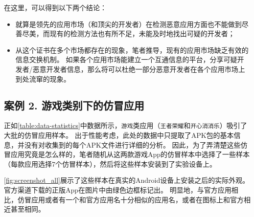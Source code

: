 在这里，可以得到以下两个结论：
\begin{itemize}
    \item 就算是领先的应用市场（和顶尖的开发者）在检测恶意应用方面也不能做到尽善尽美，而现有的检测方法也有所不足，未能及时地找出可疑的开发者；
    \item 从这个证书在多个市场都存在的现象，笔者推导，现有的应用市场缺乏有效的信息交换机制。
    如果各个应用市场能建立一个互通信息的平台，分享可疑开发者/恶意开发者信息，那么将可以杜绝一部分恶意开发者在各个应用市场上到处流窜的现象。
\end{itemize}

\subsection{案例 2. 游戏类别下的仿冒应用}

正如\autoref{table:data-statistics}中数据所示，\texttt{游戏}类应用（\texttt{王者荣耀}和\texttt{开心消消乐}）吸引了大批的仿冒应用样本。
出于性能考虑，此处的数据中只提取了APK包的基本信息，并没有对收集到的每个APK文件进行详细的分析。
因此，为了弄清楚这些仿冒应用究竟是怎么样的，笔者随机从这两款游戏App的仿冒样本中选择了一些样本（每款应用选择7个仿冒样本），然后将这些样本安装到了实验设备上。

\autoref{fig:screenshot_all}展示了这些样本在真实的Android设备上安装之后的实际外观。
官方渠道下载的正版App在图片中由绿色边框标记出。
明显地，与官方应用相比，仿冒应用或者有一个和官方应用名十分相似的应用名，或者在图标上和官方相近甚至相同。

